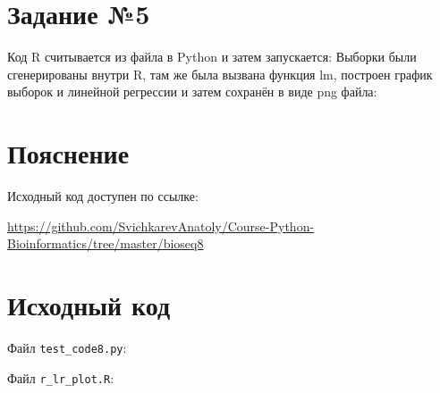 \documentclass{article} %
\begin{document}
\section{Задание №5}
Код R считывается из файла в Python и затем запускается:
%
\newpage
Выборки были сгенерированы внутри R, там же была вызвана функция lm, построен график выборок и линейной регрессии и затем сохранён в виде png файла:


\section{Пояснение}
Исходный код доступен по ссылке:

\href{https://github.com/SvichkarevAnatoly/Course-Python-Bioinformatics/tree/master/bioseq7}{https://github.com/SvichkarevAnatoly/Course-Python-Bioinformatics/tree/master/bioseq8}

\section{Исходный код}
Файл \verb$test_code8.py$:
%

Файл \verb$r_lr_plot.R$:
%
\end{document}
